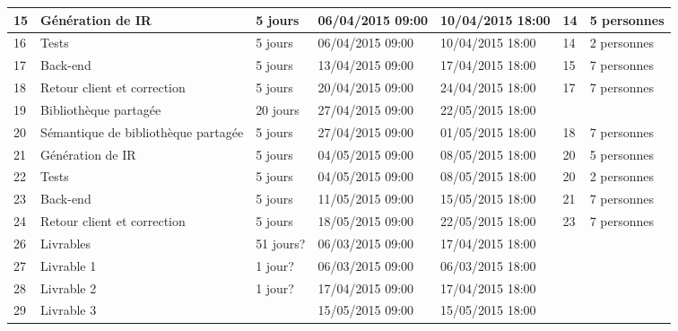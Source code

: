 \begin{table}[h]
\begin{tabular}{|l|l|l|l|l|l|l|}
15 & Génération de IR & 5 jours & 06/04/2015 09:00 & 10/04/2015 18:00 & 14 & 5 personnes \\ \hline
16 & Tests & 5 jours & 06/04/2015 09:00 & 10/04/2015 18:00 & 14 & 2 personnes \\ \hline
17 & Back-end & 5 jours & 13/04/2015 09:00 & 17/04/2015 18:00 & 15 & 7 personnes \\ \hline
18 & Retour client et correction & 5 jours & 20/04/2015 09:00 & 24/04/2015 18:00 & 17 & 7 personnes \\ \hline
19 & Bibliothèque partagée & 20 jours & 27/04/2015 09:00 & 22/05/2015 18:00 &  &  \\ \hline
20 & Sémantique de bibliothèque partagée & 5 jours & 27/04/2015 09:00 & 01/05/2015 18:00 & 18 & 7 personnes \\ \hline
21 & Génération de IR & 5 jours & 04/05/2015 09:00 & 08/05/2015 18:00 & 20 & 5 personnes \\ \hline
22 & Tests & 5 jours & 04/05/2015 09:00 & 08/05/2015 18:00 & 20 & 2 personnes \\ \hline
23 & Back-end & 5 jours & 11/05/2015 09:00 & 15/05/2015 18:00 & 21 & 7 personnes \\ \hline
24 & Retour client et correction & 5 jours & 18/05/2015 09:00 & 22/05/2015 18:00 & 23 & 7 personnes \\ \hline
26 & Livrables & 51 jours? & 06/03/2015 09:00 & 17/04/2015 18:00 &  &  \\ \hline
27 & Livrable 1 & 1 jour? & 06/03/2015 09:00 & 06/03/2015 18:00 &  &  \\ \hline
28 & Livrable 2 & 1 jour? & 17/04/2015 09:00 & 17/04/2015 18:00 &  &  \\ \hline
29 & Livrable 3 &  & 15/05/2015 09:00 & 15/05/2015 18:00 &  &  \\ \hline
\end{tabular}
\end{table}